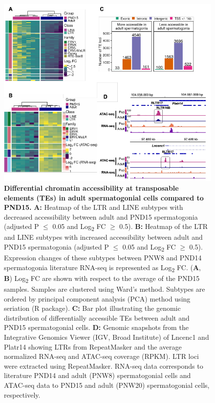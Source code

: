 \documentclass[12pt,twoside]{reedthesis}
\begin{document}
\begin{subfigures}


\begin{figure}[htbp]

{\centering \includegraphics{thesis_files/figure-latex/df5a-1} 

}

\caption[Differential chromatin accessibility at transposable elements (TEs) in adult spermatogonial cells compared to PND15]{\textbf{Differential chromatin accessibility at transposable elements (TEs) in adult spermatogonial cells compared to PND15.} \newline \textbf{A:} Heatmap of the LTR and LINE subtypes with decreased accessibility between adult and PND15 spermatogonia (adjusted P $\leq$ 0.05 and Log\textsubscript{2} FC $\geq$ 0.5). \newline \textbf{B:} Heatmap of the LTR and LINE subtypes with increased accessibility between adult and PND15 spermatogonia (adjusted P $\leq$ 0.05 and Log\textsubscript{2} FC $\geq$ 0.5). Expression changes of these subtypes between PNW8 and PND14 spermatogonia literature RNA-seq is represented as Log\textsubscript{2} FC. \newline (\textbf{A}, \textbf{B}) Log\textsubscript{2} FC are shown with respect to the average of the PND15 samples. Samples are clustered using Ward’s method. Subtypes are ordered by principal component analysis (PCA) method using seriation (R package). \newline \textbf{C:} Bar plot illustrating the genomic distribution of differentially accessible TEs between adult and PND15 spermatogonial cells. \newline \textbf{D:} Genomic snapshots from the Integrative Genomics Viewer (IGV, Broad Institute) of Lncenc1 and Platr14 showing LTRs from RepeatMasker and the average normalized RNA-seq and ATAC-seq coverage (RPKM). LTR loci were extracted using RepeatMasker. RNA-seq data corresponds to literature PND14 and adult (PNW8) spermatogonial cells and  ATAC-seq data to PND15 and adult (PNW20) spermatogonial cells, respectively.}\label{fig:df5a}
\end{figure}



\end{subfigures}
\end{document}
